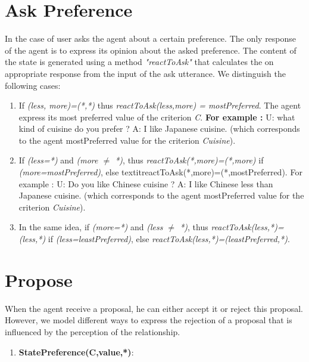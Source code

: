 \documentclass{llncs}
\begin{document}
\section{Ask Preference}
	\par In the case of user asks the agent about a certain preference. The only response of the agent is to express its opinion about the asked preference.  The content of the state is generated using a method \emph{"reactToAsk"} that calculates the on appropriate response from the input of the ask utterance. We distinguish the following cases:
		\begin{enumerate}
			\item If \textit{(less, more)=(*,*)} thus \textit{reactToAsk(less,more) = mostPreferred}. The agent express its most preferred value of the criterion \emph{C}.
				\subitem \textbf{For example :} 
				\subitem U: what kind of cuisine do you prefer ?
				\subitem A: I like Japanese cuisine. (which corresponds to the agent mostPreferred value for the criterion \textit{Cuisine}).
 
			\item  If \textit{(less=*)} and \textit{(more $\not =$ *)}, thus \textit{reactToAsk(*,more)=(*,more) } if \textit{(more=mostPreferred)}, else textit{reactToAsk(*,more)=(*,mostPreferred)}.
			\subitem For example : 
				\subitem U: Do you like Chinese cuisine ?
				\subitem A: I like Chinese less than Japanese cuisine. (which corresponds to the agent mostPreferred value for the criterion \textit{Cuisine}).
			\item In the same idea, if \textit{(more=*)} and \textit{(less $\not =$ *)}, thus \textit{reactToAsk(less,*)=(less,*)} if \textit{(less=leastPreferred)}, else \textit{reactToAsk(less,*)=(leastPreferred,*)}.
			
		\end{enumerate}

\section{Propose}
	\par When the agent receive a proposal, he can either accept it or reject this proposal. However, we model different ways to express the rejection of a proposal that is influenced by the perception of the relationship. 
		\begin{enumerate}
			\item \textbf{StatePreference(C,value,*)}:
		\end{enumerate}		
\end{document}
